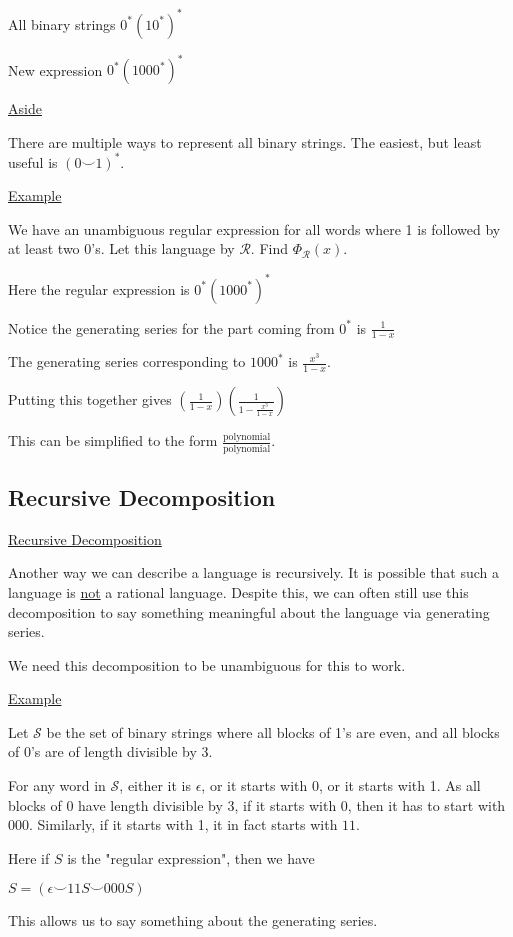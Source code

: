\documentclass{article}
\newcommand\mc{\mathcal}
\begin{document}
All binary strings $0^*(10^*)^*$

New expression $0^*(1000^*)^*$

\underline{Aside}

There are multiple ways to represent all binary strings. The easiest, but least useful is $(0 \smile 1)^*$.

\underline{Example}

We have an unambiguous regular expression for all words where 1 is followed by at least two 0's. Let this language by $\mc{R}$. Find $\Phi_{\mc{R}}(x)$.

Here the regular expression is $0^*(1000^*)^*$

Notice the generating series for the part coming from $0^*$ is $\frac{1}{1-x}$

The generating series corresponding to $1000^*$ is $\frac{x^3}{1-x}$.

Putting this together gives $(\frac{1}{1-x})(\frac{1}{1-\frac{x^3}{1-x}})$

This can be simplified to the form $\frac{\text{polynomial}}{\text{polynomial}}$.


\subsection{Recursive Decomposition}

\underline{Recursive Decomposition}

Another way we can describe a language is recursively. It is possible that such a language is \underline{not} a rational language. Despite this, we can often still use this decomposition to say something meaningful about the language via generating series.

We need this decomposition to be unambiguous for this to work.

\underline{Example}

Let $\mc{S}$ be the set of binary strings where all blocks of 1's are even, and all blocks of 0's are of length divisible by 3.

For any word in $\mc{S}$, either it is $\epsilon$, or it starts with 0, or it starts with 1. As all blocks of 0 have length divisible by 3, if it starts with 0, then it has to start with $000$. Similarly, if it starts with 1, it in fact starts with $11$. 

Here if $S$ is the "regular expression", then we have 

$S = (\epsilon \smile 11S \smile 000S)$

This allows us to say something about the generating series.
\end{document}
